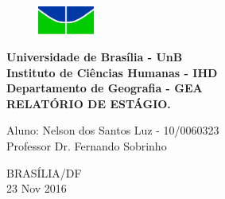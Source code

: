 \begin{titlepage}
\begin{center}
\begin{figure}[!htpb]
        \centering
        \includegraphics[width=5em]{logo/logoUnB.jpg}
\end{figure}
{\large \textbf{Universidade de Brasília - UnB}}\\[0.2cm]
{\large \textbf{Instituto de Ciências Humanas - IHD}}\\[0.2cm]
{\large \textbf{Departamento de Geografia - GEA}}\\[4.1cm]
{\bf \huge  RELATÓRIO DE ESTÁGIO.}\\[4.1cm]
\end{center}
{\large Aluno: Nelson dos Santos Luz - 10/0060323}\\[0.7cm]
{\large Professor Dr. Fernando Sobrinho }\\[4.1cm]
\begin{center}
{\large BRASÍLIA/DF}\\[0.2cm]
{\large 23 Nov 2016}
\end{center}
\end{titlepage}